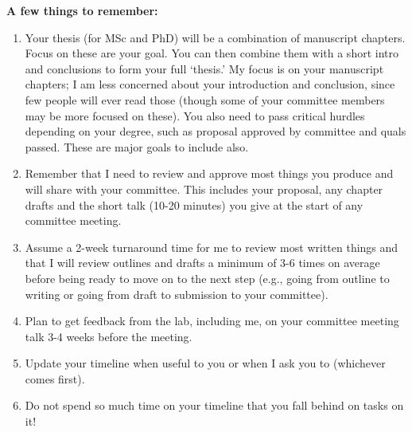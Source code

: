 \documentclass[11pt,letter]{article}
\begin{document}
{\bf A few things to remember: }
\begin{enumerate}
\item Your thesis (for MSc and PhD) will be a combination of manuscript chapters. Focus on these are your goal. You can then combine them with a short intro and conclusions to form your full `thesis.' My focus is on your manuscript chapters; I am less concerned about your introduction and conclusion, since few people will ever read those (though some of your committee members may be more focused on these). You also need to pass critical hurdles depending on your degree, such as proposal approved by committee and quals passed. These are major goals to include also. 
\item Remember that I need to review and approve most things you produce and will share with your committee. This includes your proposal, any chapter drafts and the short talk (10-20 minutes) you give at the start of any committee meeting. 
\item Assume a 2-week turnaround time for me to review most written things and that I will review outlines and drafts a minimum of 3-6 times on average before being ready to move on to the next step (e.g., going from outline to writing or going from draft to submission to your committee).
\item Plan to get feedback from the lab, including me, on your committee meeting talk 3-4 weeks before the meeting. 
\item Update your timeline when useful to you or when I ask you to (whichever comes first). 
\item Do not spend so much time on your timeline that you fall behind on tasks on it!
\end{enumerate}
\end{document}
